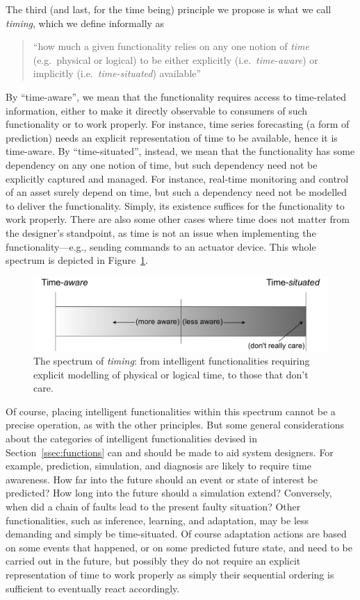 The third (and last, for the time being) principle we propose is what we call \emph{timing}, which we define informally as 
\begin{quote}
    ``how much a given functionality relies on any one notion of \emph{time} (e.g.\ physical or logical) to be either explicitly (i.e.\ \emph{time-aware}) or implicitly (i.e.\ \emph{time-situated}) available''%
\end{quote}
%
By ``time-aware'', we mean that the functionality requires access to time-related information, either to make it directly observable to consumers of such functionality or to work properly. 
For instance, time series forecasting (a form of prediction) needs an explicit representation of time to be available, hence it is time-aware. 
By ``time-situated'', instead, we mean that the functionality has some dependency on any one notion of time, but such dependency need not be explicitly captured and managed. 
For instance, real-time monitoring and control of an asset surely depend on time, but such a dependency need not be modelled to deliver the functionality. 
Simply, its existence suffices for the functionality to work properly.
There are also some other cases where time does not matter from the designer's standpoint, as time is not an issue when implementing the functionality---e.g., sending commands to an actuator device. 
This whole spectrum is depicted in Figure~\ref{fig:timing}. 

\begin{figure}[!t]
    \centering
    \includegraphics[width=.6\columnwidth]{figures/dt-mas/timing-spectrum.pdf}
    \caption{The spectrum of \emph{timing}: from intelligent functionalities requiring explicit modelling of physical or logical time, to those that don't care.}
    \label{fig:timing}
\end{figure}

Of course, placing intelligent functionalities within this spectrum cannot be a precise operation, as with the other principles. 
But some general considerations about the categories of intelligent functionalities devised in Section~\ref{ssec:functions} can and should be made to aid system designers. 
%
For example, prediction, simulation, and diagnosis are likely to require time awareness. 
How far into the future should an event or state of interest be predicted? 
How long into the future should a simulation extend? 
Conversely, when did a chain of faults lead to the present faulty situation? 
%
Other functionalities, such as inference, learning, and adaptation, may be less demanding and simply be time-situated. 
Of course adaptation actions are based on some events that happened, or on some predicted future state, and need to be carried out in the future, but possibly they do not require an explicit representation of time to work properly as simply their sequential ordering is sufficient to eventually react accordingly. 

